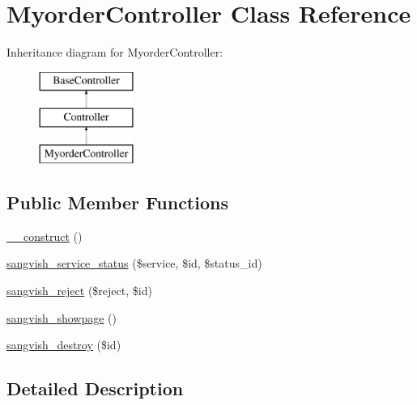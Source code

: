 \hypertarget{class_responsive_1_1_http_1_1_controllers_1_1_myorder_controller}{}\section{Myorder\+Controller Class Reference}
\label{class_responsive_1_1_http_1_1_controllers_1_1_myorder_controller}
Inheritance diagram for Myorder\+Controller\+:\begin{figure}[H]
\begin{center}
\leavevmode
\includegraphics[height=3.000000cm]{class_responsive_1_1_http_1_1_controllers_1_1_myorder_controller}
\end{center}
\end{figure}
\subsection*{Public Member Functions}
\begin{DoxyCompactItemize}
\item 
\mbox{\hyperlink{class_responsive_1_1_http_1_1_controllers_1_1_myorder_controller_a095c5d389db211932136b53f25f39685}{\+\_\+\+\_\+construct}} ()
\item 
\mbox{\hyperlink{class_responsive_1_1_http_1_1_controllers_1_1_myorder_controller_a04f97eb3751dae6f58a22741d39834b7}{sangvish\+\_\+service\+\_\+status}} (\$service, \$id, \$status\+\_\+id)
\item 
\mbox{\hyperlink{class_responsive_1_1_http_1_1_controllers_1_1_myorder_controller_aee094be2c3b1c7cc6456c8b4fe10bbd3}{sangvish\+\_\+reject}} (\$reject, \$id)
\item 
\mbox{\hyperlink{class_responsive_1_1_http_1_1_controllers_1_1_myorder_controller_ae5a8b5289e68974315c61e6e9f0e6494}{sangvish\+\_\+showpage}} ()
\item 
\mbox{\hyperlink{class_responsive_1_1_http_1_1_controllers_1_1_myorder_controller_ad99c8c5a69a0126c191ac44b8c7c88ab}{sangvish\+\_\+destroy}} (\$id)
\end{DoxyCompactItemize}


\subsection{Detailed Description}


